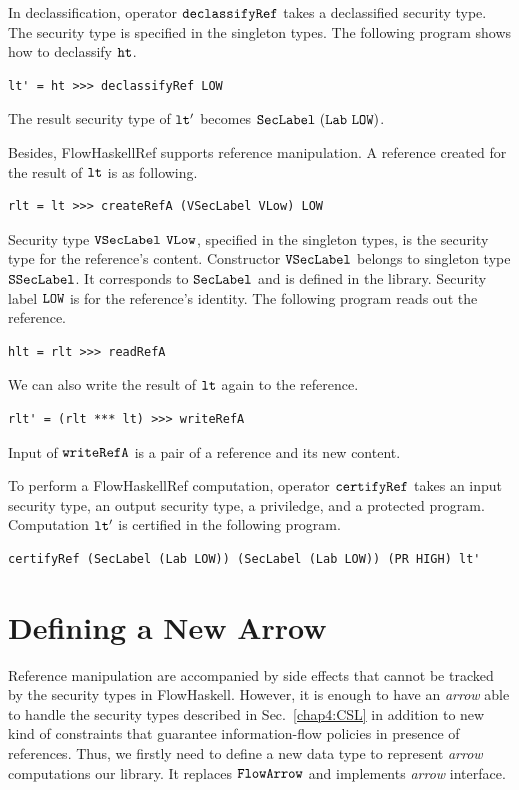 \documentclass[a4paper]{report}
\newcommand{\co}[1]{$\cod{#1}$}
\begin{document}
In declassification, operator \co{declassifyRef} takes a declassified security type.
The security type is specified in the singleton types.
The following program shows how to declassify \co{ht}.
\begin{Verbatim}[fontsize=\footnotesize]
lt' = ht >>> declassifyRef LOW
\end{Verbatim}
The result security type of \co{lt'} becomes $\mathtt{SecLabel}\ (\mathtt{Lab}\ \mathtt{LOW})$.

Besides, FlowHaskellRef supports reference manipulation. 
A reference created for the result of \co{lt} is as following.
\begin{Verbatim}[fontsize=\footnotesize]
rlt = lt >>> createRefA (VSecLabel VLow) LOW
\end{Verbatim}
Security type \co{VSecLabel} \co{VLow}, specified in the singleton types, is the security type for 
the reference's content.
Constructor \co{VSecLabel} belongs to singleton type \co{SSecLabel}. 
It corresponds to \co{SecLabel} and is defined in the library.
Security label \co{LOW} is for the reference's identity.
The following program reads out the reference.
\begin{Verbatim}[fontsize=\footnotesize]
hlt = rlt >>> readRefA 
\end{Verbatim}
We can also write the result of \co{lt} again to the reference.
\begin{Verbatim}[fontsize=\footnotesize]
rlt' = (rlt *** lt) >>> writeRefA
\end{Verbatim}
Input of \co{writeRefA} is a pair of a reference and its new content.

To perform a FlowHaskellRef computation, operator \co{certifyRef} takes an input security type,
an output security type, a priviledge, and a protected program.
Computation \co{lt'} is certified in the following program.
\begin{Verbatim}[fontsize=\footnotesize]
certifyRef (SecLabel (Lab LOW)) (SecLabel (Lab LOW)) (PR HIGH) lt'
\end{Verbatim}

\section{Defining a New Arrow}


Reference manipulation are accompanied by side effects that cannot be tracked
by the security types in FlowHaskell.  
However, it is enough to have an {\em arrow} able to handle the security types described in
Sec.~\ref{chap4:CSL} in addition to new kind of constraints that guarantee information-flow
policies in presence of references. 
Thus, we firstly need to define a new data type to represent {\em arrow} computations our library.
It replaces \co{FlowArrow} and implements {\em arrow} interface.
\end{document}
